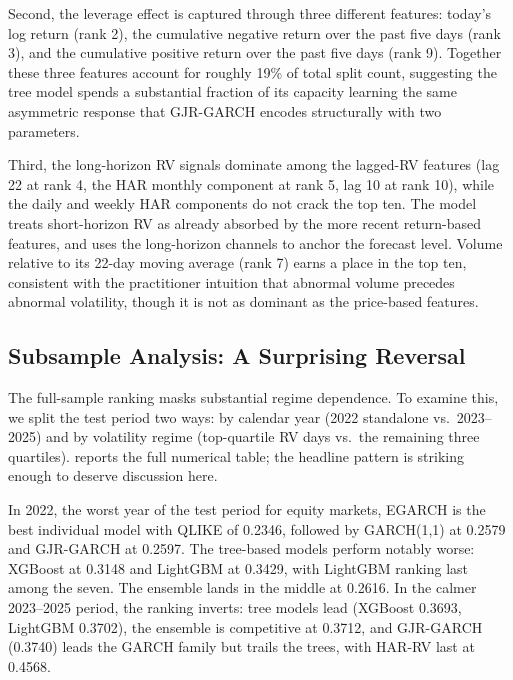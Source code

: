 Second, the leverage effect is captured through three different features: today's log return (rank 2), the cumulative negative return over the past five days (rank 3), and the cumulative positive return over the past five days (rank 9). Together these three features account for roughly 19\% of total split count, suggesting the tree model spends a substantial fraction of its capacity learning the same asymmetric response that GJR-GARCH encodes structurally with two parameters.

Third, the long-horizon RV signals dominate among the lagged-RV features (lag 22 at rank 4, the HAR monthly component at rank 5, lag 10 at rank 10), while the daily and weekly HAR components do not crack the top ten. The model treats short-horizon RV as already absorbed by the more recent return-based features, and uses the long-horizon channels to anchor the forecast level. Volume relative to its 22-day moving average (rank 7) earns a place in the top ten, consistent with the practitioner intuition that abnormal volume precedes abnormal volatility, though it is not as dominant as the price-based features.

\subsection{Subsample Analysis: A Surprising Reversal}

The full-sample ranking masks substantial regime dependence. To examine this, we split the test period two ways: by calendar year (2022 standalone vs.\ 2023--2025) and by volatility regime (top-quartile RV days vs.\ the remaining three quartiles).  reports the full numerical table; the headline pattern is striking enough to deserve discussion here.

In 2022, the worst year of the test period for equity markets, EGARCH is the best individual model with QLIKE of 0.2346, followed by GARCH(1,1) at 0.2579 and GJR-GARCH at 0.2597. The tree-based models perform notably worse: XGBoost at 0.3148 and LightGBM at 0.3429, with LightGBM ranking last among the seven. The ensemble lands in the middle at 0.2616. In the calmer 2023--2025 period, the ranking inverts: tree models lead (XGBoost 0.3693, LightGBM 0.3702), the ensemble is competitive at 0.3712, and GJR-GARCH (0.3740) leads the GARCH family but trails the trees, with HAR-RV last at 0.4568.

